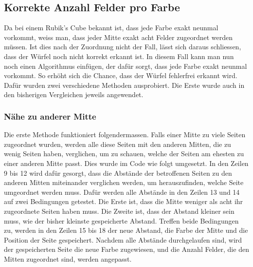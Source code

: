 \documentclass[a4paper, 12pt]{article}
\begin{document}
\subsection{Korrekte Anzahl Felder pro Farbe}
Da bei einem Rubik's Cube bekannt ist, dass jede Farbe exakt neunmal vorkommt, weiss man, dass jeder Mitte exakt acht Felder zugeordnet werden müssen. Ist dies nach der Zuordnung nicht der Fall, lässt sich daraus schliessen, dass der Würfel noch nicht korrekt erkannt ist. In diesem Fall kann man nun noch einen Algorithmus einfügen, der dafür sorgt, dass jede Farbe exakt neunmal vorkommt. So erhöht sich die Chance, dass der Würfel fehlerfrei erkannt wird. Dafür wurden zwei verschiedene Methoden ausprobiert. Die Erste wurde auch in den bisherigen Vergleichen jeweils angewendet. 
\subsubsection{Nähe zu anderer Mitte}
Die erste Methode funktioniert folgendermassen. Falls einer Mitte zu viele Seiten zugeordnet wurden, werden alle diese Seiten mit den anderen Mitten, die zu wenig Seiten haben, verglichen, um zu schauen, welche der Seiten am ehesten zu einer anderen Mitte passt. 
\newline
Dies wurde im Code wie folgt umgesetzt. In den Zeilen 9 bis 12 wird dafür gesorgt, dass die Abstände der betroffenen Seiten zu den anderen Mitten miteinander verglichen werden, um herauszufinden, welche Seite umgeordnet werden muss. Dafür werden alle Abstände in den Zeilen 13 und 14 auf zwei Bedingungen getestet. Die Erste ist, dass die Mitte weniger als acht ihr zugeordnete Seiten haben muss. Die Zweite ist, dass der Abstand kleiner sein muss, wie der bisher kleinste gespeicherte Abstand. Treffen beide Bedingungen zu, werden in den Zeilen 15 bis 18 der neue Abstand, die Farbe der Mitte und die Position der Seite gespeichert. Nachdem alle Abstände durchgelaufen sind, wird der gespeicherten Seite die neue Farbe zugewiesen, und die Anzahl Felder, die den Mitten zugeordnet sind, werden angepasst.

\end{document}
